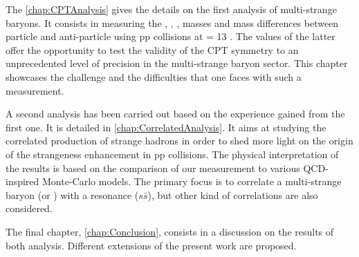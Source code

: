 The \chap\ref{chap:CPTAnalysis} gives the details on the first analysis of multi-strange baryons. It consists in measuring the \rmXiM, \rmAxiP, \rmOmegaM, \rmAomegaP  masses and mass differences between particle and anti-particle using pp collisions at \sqrtS = 13 \tev. The values of the latter offer the opportunity to test the validity of the CPT symmetry to an unprecedented level of precision in the multi-strange baryon sector. This chapter showcases the challenge and the difficulties that one faces with such a measurement.

A second analysis has been carried out based on the experience gained from the first one. It is detailed in \chap\ref{chap:CorrelatedAnalysis}. It aims at studying the correlated production of strange hadrons in order to shed more light on the origin of the strangeness enhancement in pp collisions. The physical interpretation of the results is based on the comparison of our measurement to various QCD-inspired Monte-Carlo models. The primary focus is to correlate a multi-strange baryon (\rmXi or \rmOmega) with a \rmPhiMes resonance ($s\bar{s}$), but other kind of correlations are also considered.


The final chapter, \chap\ref{chap:Conclusion}, consists in a discussion on the results of both analysis. Different extensions of the present work are proposed.